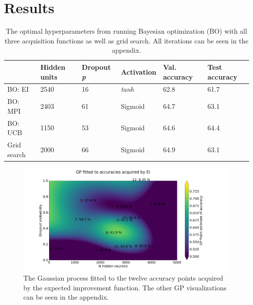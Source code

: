 \documentclass[12pt,fleqn]{article}
\begin{document}
\section{Results}
\vspace*{-0.2cm}
\begin{table}[H]\label{resultater}
	\begin{tabular}{l|lllll}
		  & Hidden units & Dropout \textit{p} & Activation & Val. accuracy &Test accuracy \\ \hline
		BO: EI  & 2540      & 16\pro              & \textit{tanh}             &    62.8\pro & 61.7\pro   \\ 
		BO: MPI & 2403         & 61\pro             & Sigmoid             & 64.7\pro  & 63.1\pro     \\ 
		BO: UCB & 1150         & 53\pro              & Sigmoid             & 64.6\pro  & 64.4\pro     \\ 
		Grid search & 2000         & 66\pro              & Sigmoid             & 64.9\pro & 63.1\pro          \\
	\end{tabular}
	\caption{The optimal hyperparameters from running Bayesian optimization (BO) with all three acquisition functions as well as grid search. All iterations can be seen in the appendix.}
\end{table}
\begin{figure}
	\centering
	
	\includegraphics[width=\textwidth]{EIGP}	
	
	\caption{The Gaussian process fitted to the twelve accuracy points acquired by the expected improvement function. The other GP visualizations can be seen in the appendix.}
	\label{fig:gp}
\end{figure}
\end{document}
